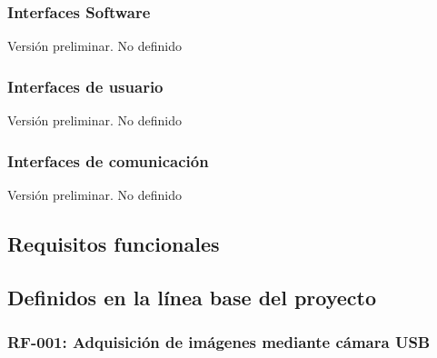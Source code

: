 \subsubsection{Interfaces Software }
Versión preliminar. No definido

\subsubsection{Interfaces de usuario}
Versión preliminar. No definido

\subsubsection{Interfaces de comunicación}
Versión preliminar. No definido

\subsection{Requisitos funcionales}
\subsection*{Definidos en la línea base del proyecto}
\subsubsection*{RF-001: Adquisición de imágenes mediante cámara USB}


